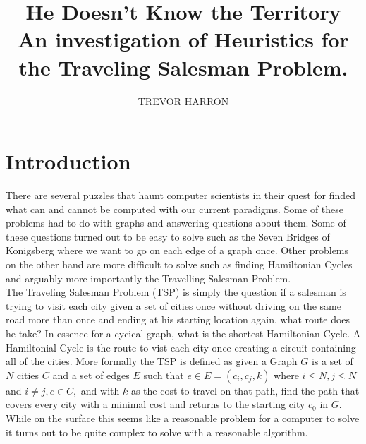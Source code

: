 \documentclass[midd]{thesis}
\title{He Doesn't Know the Territory\\
\small{An investigation of Heuristics for the Traveling Salesman Problem.}}
\author{TREVOR HARRON}
\newcommand{\tab}{\hspace*{2em}}
\begin{document}
\maketitle

\contentspage

\chapter{Introduction}
\tab There are several puzzles that haunt computer scientists in their quest for finded what can and cannot be computed with our current paradigms. Some of these problems had to do with graphs and answering questions about them. Some of these questions turned out to be easy to solve such as the Seven Bridges of Konigsberg where we want to go on each edge of a graph once. Other problems on the other hand are more difficult to solve such as finding Hamiltonian Cycles and arguably more importantly the Travelling Salesman Problem.\\
\tab The Traveling Salesman Problem (TSP) is simply the question if a salesman is trying to visit each city given a set of cities once without driving on the same road more than once and ending at his starting location again, what route does he take? In essence for a cycical graph, what is the shortest Hamiltonian Cycle. A Hamiltonial Cycle is the route to vist each city once creating a circuit containing all of the cities. More formally the TSP is defined as given a Graph $G$ is a set of $N$ cities $C$ and a set of edges $E$ such that $e \in E = (c_{i}, c_{j},k)$ where $i \le N, j \le N$ and $i \ne j, c \in C,$ and with $k$ as the cost to travel on that path, find the path that covers every city with a minimal cost and returns to the starting city $c_{0}$ in $G$. While on the surface this seems like  a reasonable problem for a computer to solve it turns out to be quite complex to solve with a reasonable algorithm.\\
\end{document}
